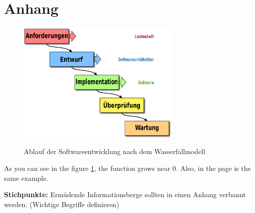 \section{Anhang}

\begin{figure}[h]
    \centering
    \includegraphics[width=0.7\textwidth]{res/Waterfall_model-de.svg.png} 
    \caption{Ablauf der Softwareentwicklung nach dem Wasserfallmodell} \cite{wasserfallmodellPic}
    \label{fig:wasserfallmodell}
\end{figure}

As you can see in the figure \ref{fig:wasserfallmodell}, the 
function grows near 0. Also, in the page \pageref{fig:wasserfallmodell} 
is the same example.

\myNewSection
\textbf{Stichpunkte:} 
Ermüdende Informationsberge sollten in einen Anhang verbannt werden. (Wichtige Begriffe definieren)
